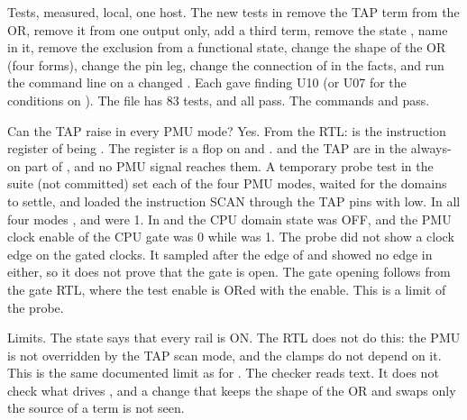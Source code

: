 \begin{record}

Tests, measured, local, one host. The new tests in  remove the TAP term from the OR, remove it from one output only, add a third term, remove the state , name  in it, remove the exclusion from a functional state, change the shape of the OR (four forms), change the pin leg, change the connection of  in the facts, and run the command line on a changed . Each gave finding U10 (or U07 for the conditions on ). The file has 83 tests, and all pass. The commands  and  pass.

\end{record}

\begin{record}

Can the TAP raise  in every PMU mode? Yes. From the RTL:  is the instruction register of  being . The register is a flop on  and .  and the TAP are in the always-on part of , and no PMU signal reaches them. A temporary probe test in the  suite (not committed) set each of the four PMU modes, waited for the domains to settle, and loaded the instruction SCAN through the TAP pins with  low. In all four modes ,  and  were 1. In  and  the CPU domain state was OFF, and the PMU clock enable of the CPU gate was 0 while  was 1. The probe did not show a clock edge on the gated clocks. It sampled after the edge of  and showed no edge in  either, so it does not prove that the gate is open. The gate opening follows from the gate RTL, where the test enable is ORed with the enable. This is a limit of the probe.

\end{record}

\begin{record}

Limits. The state  says that every rail is ON. The RTL does not do this: the PMU is not overridden by the TAP scan mode, and the clamps do not depend on it. This is the same documented limit as for . The checker reads text. It does not check what drives , and a change that keeps the shape of the OR and swaps only the source of a term is not seen.

\end{record}
